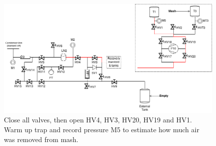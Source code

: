 \documentclass[a4paper,10pt]{article}
\begin{document}
\begin{figure}[htbp!]
 \centering
 \includegraphics[width=\textwidth]{./mash-cleaning-schematic-7-measure-trapped-gas}
 \caption{Close all valves, then open HV4, HV3, HV20, HV19 and HV1.  Warm up trap and record pressure M5 to estimate how much air was removed from mash.}
 \label{g}
\end{figure}
\end{document}
